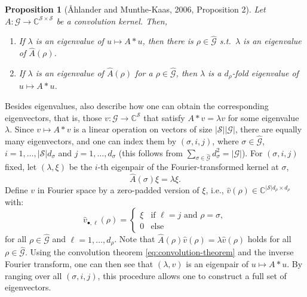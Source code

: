 \documentclass[preprint,12pt,authoryear]{elsarticle}
\newcommand{\C}{\mathbb{C}}
\newcommand{\Fourier}[1]{\widehat{#1}}
\newcommand\Gc{\mathcal G}
\newcommand\Sc{\mathcal S}
\newtheorem{proposition}{Proposition}%
\begin{document}
{\begin{proposition}[Åhlander and Munthe-Kaas, 2006, Proposition 2] %
    \label{thr:eigenvalues}
    Let $A : \Gc \rightarrow \C^{\Sc \times \Sc}$ be a convolution kernel. Then,
    \begin{enumerate}[noitemsep]
        \item If $\lambda$ is an eigenvalue of $u \mapsto A * u$, then there is $\rho \in \Fourier{\Gc}$ s.t.\ $\lambda$ is an eigenvalue of $\Fourier{A}(\rho)$.
        \item If $\lambda$ is an eigenvalue of $\Fourier{A}(\rho)$ for a $\rho \in \Fourier{\Gc}$, then $\lambda$ is a $d_\rho$-fold %
        eigenvalue of $u \mapsto A * u$.
    \end{enumerate}
\end{proposition}
Besides eigenvalues, \cite{ahlander_eigenvalues_2006} also describe how one can obtain the corresponding eigenvectors, that is, those $v : \Gc \rightarrow \C^\Sc$ that satisfy $A * v = \lambda v$ for some eigenvalue $\lambda$. 
Since $v \mapsto A * v$ is a linear operation on vectors of size $|\Sc||\Gc|$, there are equally many eigenvectors, and one can index them by $(\sigma,i,j)$, where $\sigma \in \Fourier{\Gc}$, $i = 1,\dots,|\Sc|d_\sigma$ and $j = 1,\dots, d_\sigma$ (this follows from $\sum_{\sigma \in \Fourier{\Gc}} d_\sigma^2 = |\Gc|$).
For $(\sigma,i,j)$ fixed, let $(\lambda,\xi)$ be the $i$-th eigenpair of the Fourier-transformed kernel at $\sigma$,
$$
    \Fourier{A}(\sigma) \xi = \lambda \xi.
$$ 
Define $v$ in Fourier space by a zero-padded version of $\xi$, i.e., $\Fourier{v}(\rho) \in \C^{|\Sc| d_\rho \times d_\rho}$ with:
$$
    \Fourier{v}_{\bullet,\ell}(\rho) = \begin{cases}
        \xi & \text{if } \ell = j \text{ and } \rho = \sigma, \\
        0 & \text{else}
    \end{cases}
$$
for all $\rho \in \Fourier{\Gc}$ and $\ell = 1,\dots,d_\rho$.
Note that 
$
    \Fourier{A}(\rho) \Fourier{v}(\rho) = \lambda \Fourier{v}(\rho)
$
holds for all $\rho \in \Fourier{\Gc}$. Using the convolution theorem \eqref{eq:convolution-theorem} and the inverse Fourier transform, one can then see that $(\lambda,v)$ is an eigenpair of $u \mapsto A * u$. By ranging over all $(\sigma,i,j)$, this procedure allows one to construct a full set of eigenvectors.

}
\end{document}
